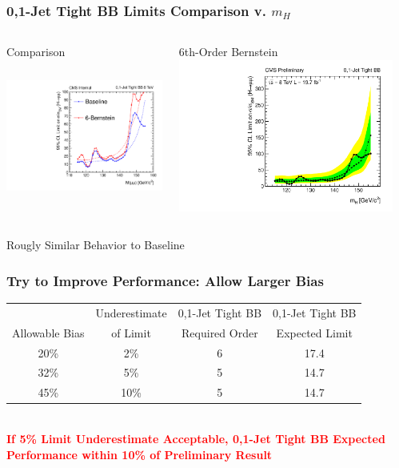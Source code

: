 \documentclass{beamer}
\newcommand{\tredbf}[1]{\textcolor{red}{\bf #1}}
\begin{document}
\begin{frame}
\frametitle{0,1-Jet Tight BB Limits Comparison v. $m_H$}
  \vspace{-1em}
  \begin{columns}[c]
   \column{60mm}
      \begin{center}
        Comparison\\
        \includegraphics[height=50mm]{redoWholeRange/limitComparison/limits_CompareExpLog.pdf}
      \end{center}
   \column{60mm}
      \begin{center}
        6th-Order Bernstein
        \includegraphics[height=50mm]{redoWholeRange/TightBB6BernResults/Jets01PassPtG10BB_8TeV.pdf}
      \end{center}
  \end{columns}
\begin{center}
  Rougly Similar Behavior to Baseline
\end{center}
\end{frame}

\begin{frame}
\frametitle{Try to Improve Performance: Allow Larger Bias}
\small
\begin{center}

\begin{tabular}{|c|c|c|c|} \hline 
 & Underestimate & 0,1-Jet Tight BB &0,1-Jet Tight BB \\ 
Allowable Bias & of Limit & Required Order & Expected Limit \\ \hline
20\%  & 2\%  & 6 & 17.4  \\ \hline
32\%  & 5\%  & 5 & 14.7 \\ \hline
45\%  & 10\% & 5 & 14.7 \\ \hline
\end{tabular}
\\
\vspace{2em}
\tredbf{
If 5\% Limit Underestimate Acceptable, 0,1-Jet Tight BB Expected Performance within 10\% of Preliminary Result
}

\end{center}
\end{frame}
\end{document}
